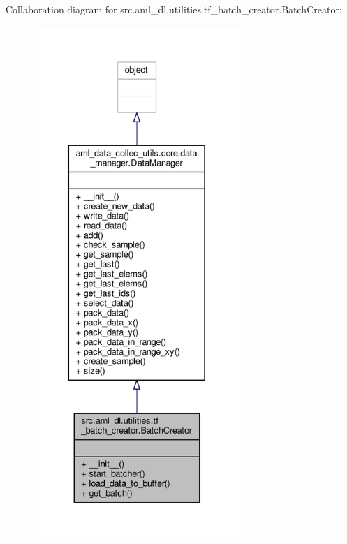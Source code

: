 Collaboration diagram for src.\-aml\-\_\-dl.\-utilities.\-tf\-\_\-batch\-\_\-creator.\-Batch\-Creator\-:
\nopagebreak
\begin{figure}[H]
\begin{center}
\leavevmode
\includegraphics[height=550pt]{classsrc_1_1aml__dl_1_1utilities_1_1tf__batch__creator_1_1_batch_creator__coll__graph}
\end{center}
\end{figure}
